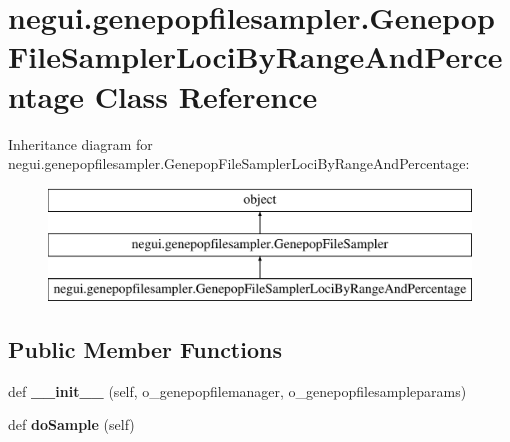 \hypertarget{classnegui_1_1genepopfilesampler_1_1GenepopFileSamplerLociByRangeAndPercentage}{}\section{negui.\+genepopfilesampler.\+Genepop\+File\+Sampler\+Loci\+By\+Range\+And\+Percentage Class Reference}
\label{classnegui_1_1genepopfilesampler_1_1GenepopFileSamplerLociByRangeAndPercentage}
Inheritance diagram for negui.\+genepopfilesampler.\+Genepop\+File\+Sampler\+Loci\+By\+Range\+And\+Percentage\+:\begin{figure}[H]
\begin{center}
\leavevmode
\includegraphics[height=3.000000cm]{classnegui_1_1genepopfilesampler_1_1GenepopFileSamplerLociByRangeAndPercentage}
\end{center}
\end{figure}
\subsection*{Public Member Functions}
\begin{DoxyCompactItemize}
\item 
def {\bfseries \+\_\+\+\_\+init\+\_\+\+\_\+} (self, o\+\_\+genepopfilemanager, o\+\_\+genepopfilesampleparams)\hypertarget{classnegui_1_1genepopfilesampler_1_1GenepopFileSamplerLociByRangeAndPercentage_a54d1db74e827c7d4ec18877699ea1ac3}{}\label{classnegui_1_1genepopfilesampler_1_1GenepopFileSamplerLociByRangeAndPercentage_a54d1db74e827c7d4ec18877699ea1ac3}

\item 
def {\bfseries do\+Sample} (self)\hypertarget{classnegui_1_1genepopfilesampler_1_1GenepopFileSamplerLociByRangeAndPercentage_a7ca84c7c483acade24446fef9d018686}{}\label{classnegui_1_1genepopfilesampler_1_1GenepopFileSamplerLociByRangeAndPercentage_a7ca84c7c483acade24446fef9d018686}

\end{DoxyCompactItemize}


